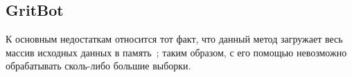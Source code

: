 \subsection{GritBot}
К основным недостаткам относится тот факт, что данный метод загружает весь массив исходных данных в память~\cite{BaySchwabacherOrca}; таким образом, с его помощью невозможно обрабатывать сколь-либо большие выборки.